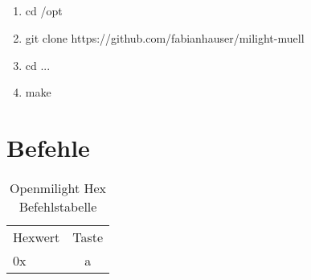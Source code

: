 \subsection{}
\begin{enumerate}
	\item cd /opt
	\item git clone https://github.com/fabianhauser/milight-muell
	\item cd ...
	\item make
\end{enumerate}

\section{Befehle}
\begin{table}[h]
	\centering
	\begin{tabu} to \linewidth {l c}
		\toprule
		Hexwert & Taste \\
		0x & a \\
		\bottomrule
	\end{tabu}
	\caption{Openmilight Hex Befehlstabelle}
\end{table}




